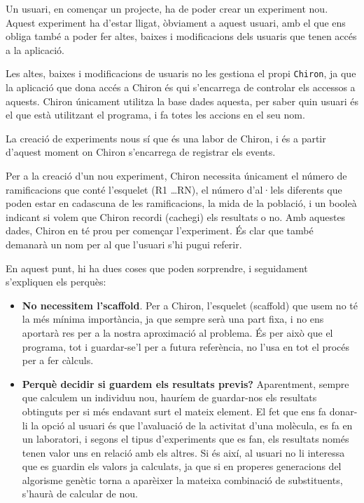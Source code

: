 Un usuari, en començar un projecte, ha de poder crear un experiment nou.  Aquest
experiment ha d'estar lligat, òbviament a aquest usuari, amb el que ens obliga
també a poder fer altes, baixes i modificacions dels usuaris que tenen accés a
la aplicació.

Les altes, baixes i modificacions de usuaris no les gestiona el propi
\texttt{Chiron}, ja que la aplicació que dona accés a Chiron és qui s'encarrega
de controlar els accessos a aquests.  Chiron únicament utilitza la base dades
aquesta, per saber quin usuari és el que està utilitzant el programa, i fa totes
les accions en el seu nom.

La creació de experiments nous sí que és una labor de Chiron, i és a partir
d'aquest moment on Chiron s'encarrega de registrar els events.

Per a la creació d'un nou experiment, Chiron necessita únicament el número de
ramificacions que conté l'esquelet (R1 \dots RN), el número d'al·lels diferents que
poden estar en cadascuna de les ramificacions, la mida de la població, i un booleà
indicant si volem que Chiron recordi (cachegi) els resultats o no.  Amb aquestes
dades, Chiron en té prou per començar l'experiment.  És clar que també demanarà
un nom per al que l'usuari s'hi pugui referir.

En aquest punt, hi ha dues coses que poden sorprendre, i seguidament s'expliquen
els perquès:

\begin{itemize}
	\item \textbf{No necessitem l'scaffold}. Per a Chiron, l'esquelet (scaffold)
	que usem no té la més mínima importància, ja que sempre serà una part fixa,
	i no ens aportarà res per a la nostra aproximació al problema.  És per això
	que el programa, tot i guardar-se'l per a futura referència, no l'usa en tot
	el procés per a fer càlculs.

	\item \textbf{Perquè decidir si guardem els resultats previs?}
	Aparentment, sempre que calculem un individuu nou, hauríem de guardar-nos
	els resultats obtinguts per si més endavant surt el mateix element.  El fet
	que ens fa donar-li la opció al usuari és que l'avaluació de la activitat
	d'una molècula, es fa en un laboratori, i segons el tipus d'experiments que
	es fan, els resultats només tenen valor uns en relació amb els altres.  Si
	és així, al usuari no li interessa que es guardin els valors ja calculats,
	ja que si en properes generacions del algorisme genètic torna a aparèixer la
	mateixa combinació de substituents, s'haurà de calcular de nou.
\end{itemize}

